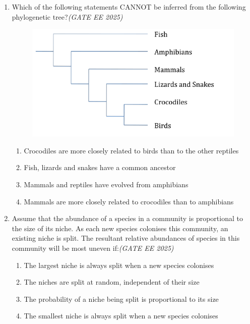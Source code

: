 \begin{enumerate}[leftmargin=*,label=\textbf{Q.\arabic*},resume]
\item Which of the following statements CANNOT be inferred from the following phylogenetic tree?\hfill \textit{(GATE EE 2025)}
\vspace{1em}
\begin{figure}[h!]
    \centering
    \includegraphics[width=0.9\linewidth]{figs/imageQ28.png}
\end{figure}
\vspace{1em}
\begin{multicols}{2}
\begin{enumerate}[label=(\Alph*)]
\item Crocodiles are more closely related to birds than to the other reptiles
\item Fish, lizards and snakes have a common ancestor
\item Mammals and reptiles have evolved from amphibians
\item Mammals are more closely related to crocodiles than to amphibians
\end{enumerate}
\end{multicols}

\item Assume that the abundance of a species in a community is proportional to the size of its niche. As each new species colonises this community, an existing niche is split. The resultant relative abundances of species in this community will be most uneven if:\hfill \textit{(GATE EE 2025)}
\begin{multicols}{2}
\begin{enumerate}[label=(\Alph*)]
\item The largest niche is always split when a new species colonises
\item The niches are split at random, independent of their size
\item The probability of a niche being split is proportional to its size
\item The smallest niche is always split when a new species colonises
\end{enumerate}
\end{multicols}

\end{enumerate}
\newpage
{}

